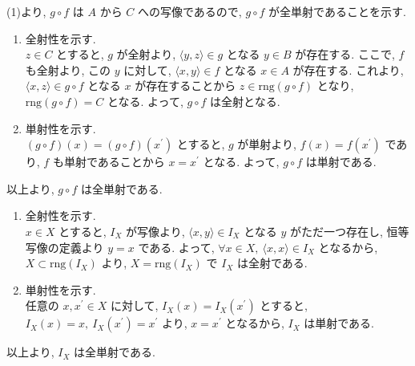 \begin{nmprob}
{\item
(1)より, $g\circ f$ は $A$ から $C$ への写像であるので, $g\circ f$ が全単射であることを示す.
\begin{enumerate}
\item 全射性を示す.\\
$z \in C$ とすると, $g$ が全射より, $\langle y, z\rangle \in g$ となる $y \in B$ が存在する. ここで, $f$ も全射より, この $y$ に対して, $\langle x, y\rangle \in f$ となる $x \in A$ が存在する.
これより, $\langle x, z\rangle \in g \circ f$ となる $x$ が存在することから $z \in \text{rng}(g \circ f)$ となり, $\text{rng}(g \circ f) = C$ となる. よって, $g\circ f$ は全射となる.
\item 単射性を示す.\\
$(g\circ f)(x) = (g\circ f)(x^{'})$ とすると, $g$ が単射より, $f(x) = f(x^{'})$ であり, $f$ も単射であることから $x = x^{'}$ となる. よって, $g\circ f$ は単射である.
\end{enumerate}
以上より, $g\circ f$ は全単射である.
\item
\begin{enumerate}
\item 全射性を示す.\\
$x \in X$ とすると, $I_X$ が写像より, $\langle x, y\rangle \in I_X$ となる $y$ がただ一つ存在し, 恒等写像の定義より $y = x$ である.
よって, $\forall x \in X,\ \langle x, x\rangle \in I_X$ となるから, $X \subset \text{rng}(I_X)$ より, $X = \text{rng}(I_X)$ で $I_X$ は全射である.
\item 単射性を示す.\\
任意の $x, x^{'} \in X$ に対して, $I_X(x) = I_X(x^{'})$ とすると, $I_X(x) = x,\ I_X(x^{'}) = x^{'}$ より, $x = x^{'}$ となるから, $I_X$ は単射である.
\end{enumerate}
以上より, $I_X$ は全単射である.
}
\end{nmprob}



